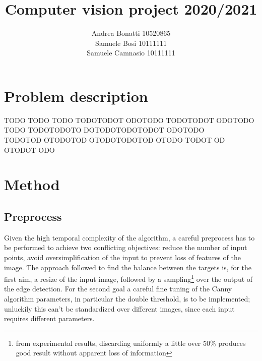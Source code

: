 \documentclass[12pt]{article}
\begin{document}
%

\def\spacingset#1{\renewcommand{\baselinestretch}%
{#1}\small\normalsize} \spacingset{1}



  \title{\bf Computer vision project 2020/2021}
  \author{Andrea Bonatti 10520865\hspace{.2cm}\\
    Samuele Bosi 10111111 \\
    Samuele Camnasio 10111111}
  \maketitle

\newpage
\spacingset{1.8} %
\section{Problem description}
\label{sec:probdesrc}

TODO TODO TODO TODOTODOT ODOTODO TODOTODOT ODOTODO
TODO TODOTODOTO DOTODOTODOTODOT ODOTODO\\
TODOTOD OTODOTOD OTODOTODOTOD OTODO
TODOT OD OTODOT ODO


\section{Method}
\label{sec:meth}
\subsection{Preprocess}
Given the high temporal complexity of the algorithm, a careful preprocess has to be performed to achieve two conflicting objectives: reduce the number of input points, avoid oversimplification of the input to prevent loss of features of the image. The approach followed to find the balance between the targets is, for the first aim, a resize of the input image, followed by a sampling\footnote{ from experimental results, discarding uniformly a little over 50\% produces good result without apparent loss of information 
} over the output of the edge detection. For the second goal a careful fine tuning of the Canny algorithm parameters, in particular the double threshold, is to be implemented; unluckily this can’t be standardized over different images, since each input requires different parameters.
\end{document}
